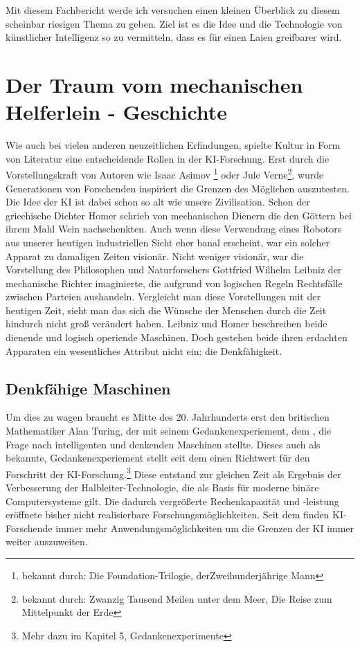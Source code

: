 \documentclass[12pt,german,ngerman]{report}
\begin{document}
    Mit diesem Fachbericht werde ich versuchen einen kleinen Überblick zu diesem scheinbar riesigen Thema zu geben.
    Ziel ist es die Idee und die Technologie von künstlicher Intelligenz so zu vermitteln, 
    dass es für einen Laien greifbarer wird.

    

\chapter{Der Traum vom mechanischen Helferlein - Geschichte}

    Wie auch bei vielen anderen neuzeitlichen Erfindungen, spielte Kultur in Form von Literatur eine entscheidende Rollen
    in der KI-Forschung. Erst durch die Vorstellungskraft von Autoren wie Isaac Asimov
    \footnote{bekannt durch: Die Foundation-Trilogie, derZweihunderjährige Mann}
    oder Jule Verne\footnote{bekannt durch: Zwanzig Tausend Meilen unter dem Meer, Die Reise zum Mittelpunkt der Erde}, 
    wurde Generationen von Forschenden inspiriert die Grenzen des Möglichen auszutesten. 
    Die Idee der KI ist dabei schon so alt wie unsere Zivilisation. 
    Schon der griechische Dichter Homer schrieb von mechanischen Dienern die den Göttern bei ihrem Mahl
    Wein nachschenkten.\cite[53]{buchanan2005very} Auch wenn diese Verwendung eines Robotors aus unserer heutigen
    industriellen Sicht eher banal erscheint, war ein solcher Apparat zu damaligen Zeiten visionär.
    Nicht weniger visionär, war die Vorstellung des Philosophen und Naturforschers Gottfried Wilhelm Leibniz der mechanische
    Richter imaginierte, die aufgrund von logischen Regeln Rechtsfälle zwischen Parteien aushandeln.\cite[53]{buchanan2005very}
    Vergleicht man diese Vorstellungen mit der heutigen Zeit, sieht man das sich die Wünsche der Menschen durch die Zeit hindurch
    nicht groß verändert haben. Leibniz und Homer beschreiben beide dienende und logisch operiende Maschinen.
    Doch gestehen beide ihren erdachten Apparaten ein wesentliches Attribut nicht ein: die Denkfähigkeit. 
    \section{Denkfähige Maschinen}
    Um dies zu wagen braucht es Mitte des 20. Jahrhunderts erst den britischen Mathematiker Alan Turing, 
    der mit seinem Gedankenexperiement, dem , 
    die Frage nach intelligenten und denkenden Maschinen stellte.
    Dieses auch als  bekannte, Gedankenexperiement stellt seit dem einen 
    Richtwert für den Forschritt der KI-Forschung.\footnote{Mehr dazu im Kapitel 5, Gedankenexperimente}
    Diese entstand zur gleichen Zeit als Ergebnis der Verbesserung der Halbleiter-Technologie, die als Basis für 
    moderne binäre Computersysteme gilt. Die dadurch vergrößerte Rechenkapazität und -leistung 
    eröffnete bisher nicht realisierbare Forschungsmöglichkeiten. 
    Seit dem finden KI-Forschende immer mehr Anwendungsmöglichkeiten um die Grenzen der KI immer weiter auszuweiten.\\
    
\end{document}
